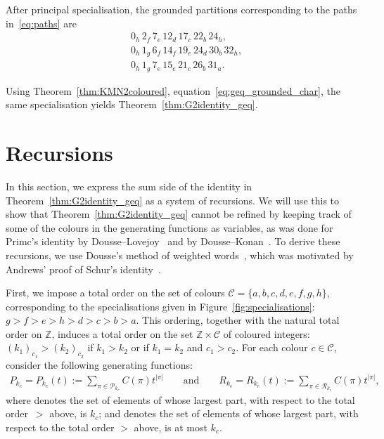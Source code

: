 \documentclass[10pt,a4paper]{amsart}
\numberwithin{equation}{section}
\theoremstyle{definition}
\newcommand{\Z}{\mathbb{Z}}
\begin{document}
After principal specialisation, the grounded partitions corresponding to the paths in~\eqref{eq:paths} are
\begin{align*}
&0_h\,2_f\,7_e\,12_d\,17_c\,22_b\,24_h,\\
&0_h\,1_g\,6_f\,14_f\,19_e\,24_d\,30_b\,32_h,\\
&0_h\,1_g\,7_e\,15_e\,21_c\,26_b\,31_a.
\end{align*}

Using Theorem~\ref{thm:KMN2coloured}, equation~\eqref{eq:geq_grounded_char}, the same specialisation yields Theorem~\ref{thm:G2identity_geq}.


\section{Recursions}\label{section:recursions}

In this section, we express the sum side of the identity in Theorem~\ref{thm:G2identity_geq} as a system of recursions. We will use this to show that Theorem~\ref{thm:G2identity_geq} cannot be refined by keeping track of some of the colours in the generating functions as variables, as was done for Primc's identity by Dousse--Lovejoy~\cite{DL18} and by Dousse--Konan~\cite{DK22a}. To derive these recursions, we use Dousse's method of weighted words~\cite{D17}, which was motivated by Andrews' proof of Schur's identity~\cite{And67}.

First, we impose a total order on the set of colours $\mathcal{C}=\{a,b,c,d,e,f,g,h\}$, corresponding to the specialisations given in Figure~\ref{fig:specialisations}: $g > f > e > h > d > c > b > a$. This ordering, together with the natural total order on $\Z$, induces a total order on the set $\mathbb{Z}\times \mathcal{C}$ of coloured integers: $(k_1)_{c_1}>(k_2)_{c_2}$ if $k_1>k_2$ or if $k_1=k_2$ and $c_1>c_2$. For each colour $c \in \mathcal{C}$, consider the following generating functions:
\begin{align*}
P_{k_c} = P_{k_c}(t) := \sum_{\pi \in \mathcal{P}_{k_c}} C(\pi)t^{|\pi|} \qquad \text{and} \qquad R_{k_c} = R_{k_c}(t) := \sum_{\pi \in \mathcal{R}_{k_c}}C(\pi)t^{|\pi|},
\end{align*}
where  denotes the set of elements of  whose largest part, with respect to the total order~$>$ above, is $k_c$; and  denotes the set of elements of  whose largest part, with respect to the total order $>$ above, is at most $k_c$.
\end{document}
